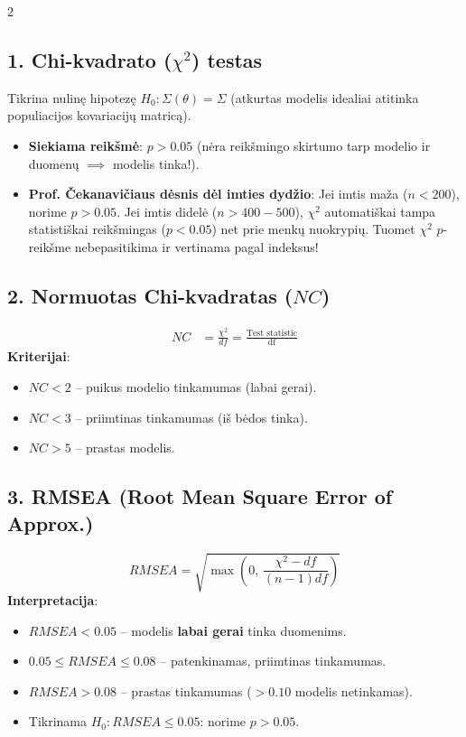 \documentclass[9pt,a4paper]{article}
\begin{document}
\begin{multicols*}{2}
\subsection{1. Chi-kvadrato ($\chi^2$) testas}
Tikrina nulinę hipotezę $H_0: \Sigma(\theta) = \Sigma$ (atkurtas modelis idealiai atitinka populiacijos kovariacijų matricą).
\begin{itemize}
    \item \textbf{Siekiama reikšmė}: $p > 0.05$ (nėra reikšmingo skirtumo tarp modelio ir duomenų $\implies$ modelis tinka!).
    \item \textbf{Prof. Čekanavičiaus dėsnis dėl imties dydžio}:
    Jei imtis maža ($n < 200$), norime $p > 0.05$. Jei imtis didelė ($n > 400-500$), $\chi^2$ automatiškai tampa statistiškai reikšmingas ($p < 0.05$) net prie menkų nuokrypių. Tuomet $\chi^2$ $p$-reikšme nebepasitikima ir vertinama pagal indeksus!
\end{itemize}

\subsection{2. Normuotas Chi-kvadratas ($NC$)}
\begin{align*}
    NC &= \frac{\chi^2}{df} = \frac{\text{Test statistic}}{\text{df}}
\end{align*}
\textbf{Kriterijai}:
\begin{itemize}
    \item $NC < 2$ -- puikus modelio tinkamumas (labai gerai).
    \item $NC < 3$ -- priimtinas tinkamumas (iš bėdos tinka).
    \item $NC > 5$ -- prastas modelis.
\end{itemize}

\subsection{3. RMSEA (Root Mean Square Error of Approx.)}
\begin{equation*}
    RMSEA = \sqrt{\max\left(0,\, \frac{\chi^2 - df}{(n - 1)df}\right)}
\end{equation*}
\textbf{Interpretacija}:
\begin{itemize}
    \item $RMSEA < 0.05$ -- modelis \textbf{labai gerai} tinka duomenims.
    \item $0.05 \le RMSEA \le 0.08$ -- patenkinamas, priimtinas tinkamumas.
    \item $RMSEA > 0.08$ -- prastas tinkamumas ($> 0.10$ modelis netinkamas).
    \item Tikrinama $H_0: RMSEA \le 0.05$: norime $p > 0.05$.
\end{itemize}


\end{multicols*}
\end{document}
